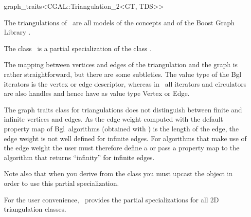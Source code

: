 

\begin{ccRefClass}{graph_traits<CGAL::Triangulation_2<GT, TDS>>}

\ccDefinition
  
The triangulations of \cgal\ are all models of the concepts  and 
  of the Boost Graph Library \cite{}.

The class \ccRefName\ is a partial specialization of the class 
{}.


The mapping between vertices and edges of the triangulation and the
graph is rather straightforward, but there are some subtleties. The
value type of the {\sc Bgl} iterators is the vertex or edge descriptor,
whereas in \cgal\ all iterators and circulators are also handles and
hence have as value type Vertex or Edge.

The graph traits class for triangulations does not distinguish between
finite and infinite vertices and edges. As the edge weight computed
with the default property map of {\sc Bgl}\ algorithms (obtained with
) is the length of the edge, 
the edge weight is not well defined for infinite edges. For algorithms 
that make use of the edge weight the user must therefore
define a 
{} or pass a property map to the
algorithm that returns ``infinity'' for infinite edges. 


Note also that when you derive from the class 
you must upcast the object in order to use this partial specialization.

For the user convenience, \cgal\ provides the partial specializations
for all 2D triangulation classes.






\ccTypes




\end{ccRefClass}
